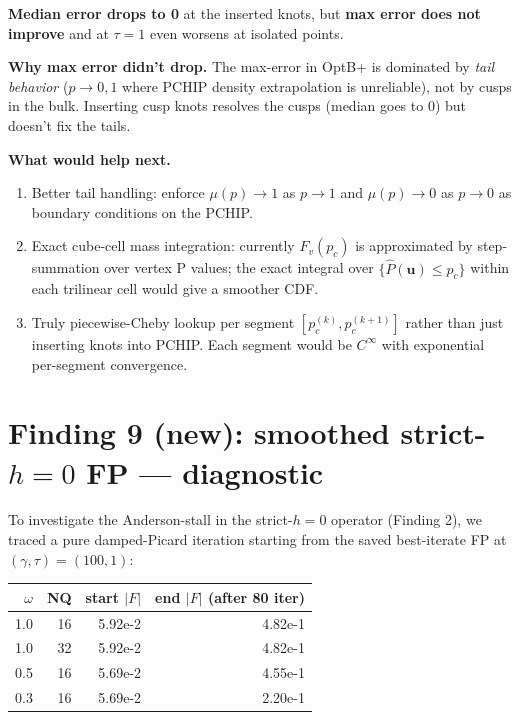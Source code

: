 \documentclass[11pt]{article}
\begin{document}
\textbf{Median error drops to 0} at the inserted knots, but \textbf{max
error does not improve} and at $\tau = 1$ even worsens at isolated
points.

\textbf{Why max error didn't drop.} The max-error in OptB+ is dominated
by \emph{tail behavior} ($p \to 0, 1$ where PCHIP density extrapolation
is unreliable), not by cusps in the bulk. Inserting cusp knots resolves
the cusps (median goes to 0) but doesn't fix the tails.

\textbf{What would help next.}
\begin{enumerate}\itemsep1pt
  \item Better tail handling: enforce $\mu(p) \to 1$ as $p \to 1$ and
        $\mu(p) \to 0$ as $p \to 0$ as boundary conditions on the PCHIP.
  \item Exact cube-cell mass integration: currently $F_v(p_c)$ is
        approximated by step-summation over vertex P values; the exact
        integral over $\{\hat P(\mathbf{u}) \le p_c\}$ within each
        trilinear cell would give a smoother CDF.
  \item Truly piecewise-Cheby lookup per segment $[p_c^{(k)}, p_c^{(k+1)}]$
        rather than just inserting knots into PCHIP. Each segment would
        be $C^\infty$ with exponential per-segment convergence.
\end{enumerate}

\section{Finding 9 (new): smoothed strict-$h{=}0$ FP --- diagnostic}

To investigate the Anderson-stall in the strict-$h{=}0$ operator
(Finding 2), we traced a pure damped-Picard iteration starting from the
saved best-iterate FP at $(\gamma, \tau) = (100, 1)$:

\begin{center}\begin{tabular}{rrrr}\toprule
$\omega$ & NQ & start $|F|$ & end $|F|$ (after 80 iter) \\
\midrule
1.0  & 16 & 5.92e-2 & 4.82e-1 \\
1.0  & 32 & 5.92e-2 & 4.82e-1 \\
0.5  & 16 & 5.69e-2 & 4.55e-1 \\
0.3  & 16 & 5.69e-2 & 2.20e-1 \\
\bottomrule\end{tabular}\end{center}
\end{document}
